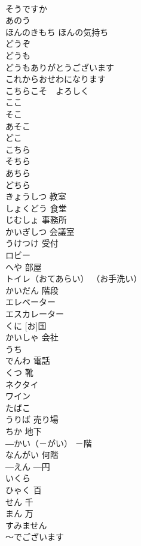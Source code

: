 \documentclass[8pt]{extreport}
\begin{document}
\begin{CJK}{UTF8}{min}
\\	そうですか			
\\	あのう			
\\	ほんのきもち	ほんの気持ち	
\\	どうぞ			
\\	どうも			
\\	どうもありがとうございます			
\\	これからおせわになります			
\\	こちらこそ　よろしく			
\\	ここ			
\\	そこ			
\\	あそこ			
\\	どこ			
\\	こちら			
\\	そちら			
\\	あちら			
\\	どちら			
\\	きょうしつ	教室	
\\	しょくどう	食堂	
\\	じむしょ	事務所	
\\	かいぎしつ	会議室	
\\	うけつけ	受付	
\\	ロビー			
\\	へや	部屋	
\\	トイレ（おてあらい）	（お手洗い）	
\\	かいだん	階段	
\\	エレベーター			
\\	エスカレーター			
\\	[お]くに	[お]国	
\\	かいしゃ	会社	
\\	うち			
\\	でんわ	電話	
\\	くつ	靴	
\\	ネクタイ			
\\	ワイン			
\\	たばこ			
\\	うりば	売り場	
\\	ちか	地下	
\\	―かい（－がい）	－階	
\\	なんがい	何階	
\\	―えん	―円	
\\	いくら			
\\	ひゃく	百	
\\	せん	千	
\\	まん	万	
\\	すみません			
\\	～でございます			

\end{CJK}
\end{document}
